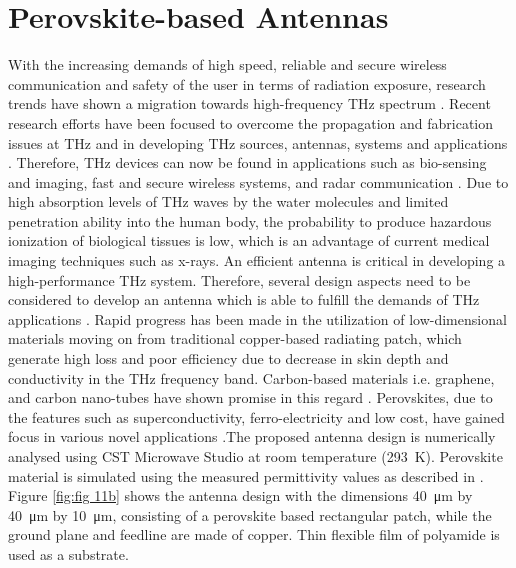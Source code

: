 \documentclass[12pt]{suhbook}
\begin{document}
\section{Perovskite-based Antennas}
% 
 With the increasing demands of high speed, reliable and secure wireless communication and safety of the user in terms of radiation exposure, research trends have shown a migration towards high-frequency THz spectrum \cite{ghann2017terahertz,rabbani2017liquid}. Recent research efforts have been focused to overcome the propagation and fabrication issues at THz and in developing THz sources, antennas, systems and applications \cite{siegel2002terahertz}. Therefore, THz devices can now be found in applications such as bio-sensing and imaging, fast and secure wireless systems, and radar communication \cite{ranzani2013g,khatib2018response}. Due to high absorption levels of THz waves by the water molecules and limited penetration ability into the human body, the probability to produce hazardous ionization of biological tissues is low, which is an advantage of current medical imaging techniques such as x-rays. An efficient antenna is critical in developing a high-performance THz system. Therefore, several design aspects need to be considered to develop an antenna which is able to fulfill the demands of THz applications \cite{chen2016research}. Rapid progress has been made in the utilization of low-dimensional materials moving on from traditional copper-based radiating patch, which generate high loss and poor efficiency due to decrease in skin depth and conductivity in the THz frequency band. Carbon-based materials i.e. graphene, and carbon nano-tubes have shown promise in this regard \cite{naghdehforushha2017design}. Perovskites, due to the features such as superconductivity, ferro-electricity and low cost, have gained focus in various novel applications \cite{huang2014low}.The proposed antenna design is numerically analysed using CST Microwave Studio at room temperature (\SI{293}{\kelvin}). Perovskite material is simulated using the measured permittivity values as described in \cite{green2014emergence}. Figure \ref{fig:fig 11b} shows the antenna design with the dimensions \SI{40}{\um} by \SI{40}{\um} by \SI{10}{\um}, consisting of a perovskite based rectangular patch, while the ground plane and feedline are made of copper. Thin flexible film of polyamide is used as a substrate.
% 
\end{document}
